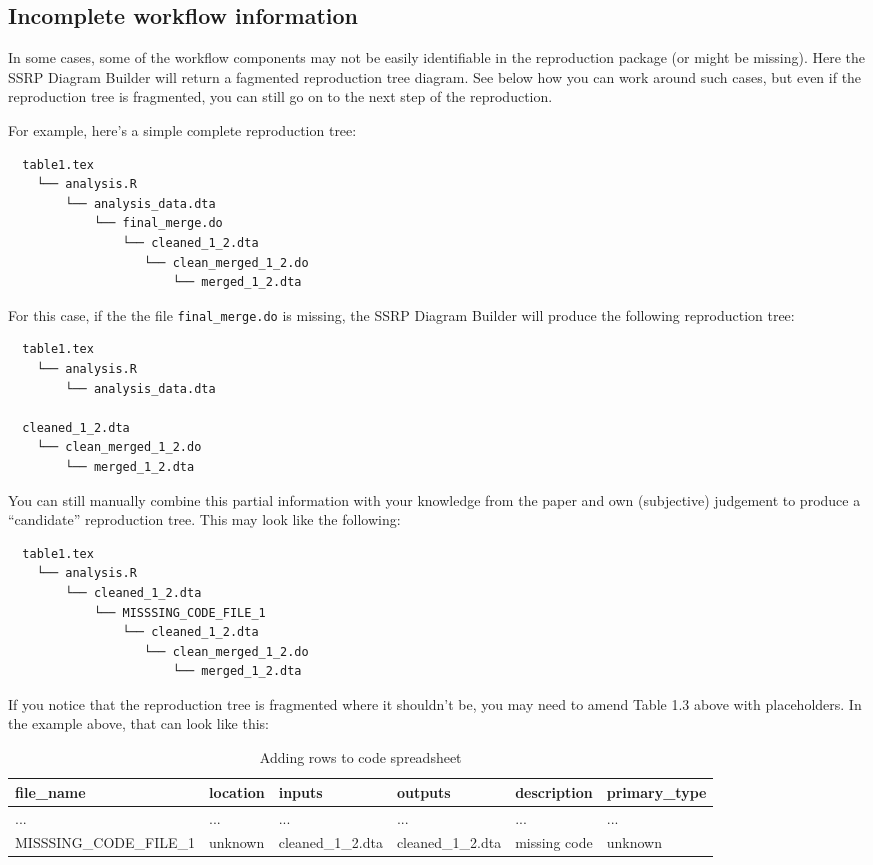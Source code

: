 \documentclass[
]{book}
\begin{document}
\hypertarget{incomplete-workflow-information}{%
\subsection{Incomplete workflow information}\label{incomplete-workflow-information}}

In some cases, some of the workflow components may not be easily identifiable in the reproduction package (or might be missing). Here the SSRP Diagram Builder will return a fagmented reproduction tree diagram. See below how you can work around such cases, but even if the reproduction tree is fragmented, you can still go on to the next step of the reproduction.

For example, here's a simple complete reproduction tree:

\begin{verbatim}
  table1.tex
    └── analysis.R
        └── analysis_data.dta
            └── final_merge.do
                └── cleaned_1_2.dta
                   └── clean_merged_1_2.do
                       └── merged_1_2.dta
\end{verbatim}

For this case, if the the file \texttt{final\_merge.do} is missing, the SSRP Diagram Builder will produce the following reproduction tree:

\begin{verbatim}
  table1.tex
    └── analysis.R
        └── analysis_data.dta

  cleaned_1_2.dta
    └── clean_merged_1_2.do
        └── merged_1_2.dta
\end{verbatim}

You can still manually combine this partial information with your knowledge from the paper and own (subjective) judgement to produce a ``candidate'' reproduction tree. This may look like the following:

\begin{verbatim}
  table1.tex
    └── analysis.R
        └── cleaned_1_2.dta
            └── MISSSING_CODE_FILE_1
                └── cleaned_1_2.dta
                   └── clean_merged_1_2.do
                       └── merged_1_2.dta
\end{verbatim}

If you notice that the reproduction tree is fragmented where it shouldn't be, you may need to amend Table 1.3 above with placeholders. In the example above, that can look like this:

\begin{table}

\caption{\label{tab:adding-rows}Adding rows to code spreadsheet}
\centering
\begin{tabu} to 
\hline
file\_name & location & inputs & outputs & description & primary\_type\\
\hline
... & ... & ... & ... & ... & ...\\
\hline
MISSSING\_CODE\_FILE\_1 & unknown & cleaned\_1\_2.dta & cleaned\_1\_2.dta & missing code & unknown\\
\hline
\end{tabu}
\end{table}
\end{document}
